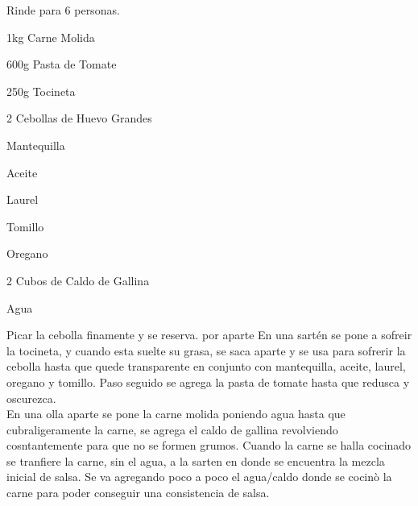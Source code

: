 
Rinde para 6 personas.

\begin{ingredientes}
\item 1kg Carne Molida
\item 600g Pasta de Tomate
\item 250g Tocineta
\item 2 Cebollas de Huevo Grandes
\item Mantequilla
\item Aceite
\item Laurel
\item Tomillo
\item Oregano
\item 2 Cubos de Caldo de Gallina
\item Agua
\end{ingredientes}
\preparacion
Picar la cebolla finamente y se reserva. por aparte En una sartén se pone a sofreir la tocineta, y cuando esta suelte su grasa, se saca aparte y se usa para sofrerir la cebolla hasta que quede transparente en conjunto con mantequilla, aceite, laurel, oregano y tomillo. Paso seguido se agrega la pasta de tomate hasta que redusca y oscurezca.\\

En una olla aparte se pone la carne molida poniendo agua hasta que cubraligeramente la carne, se agrega el caldo de gallina revolviendo cosntantemente para que no se formen grumos. Cuando la carne se halla cocinado se tranfiere la carne, sin el agua, a la sarten en donde se encuentra la mezcla inicial de salsa. Se va agregando poco a poco el agua/caldo donde se cocinò la carne para poder conseguir una consistencia de salsa.\\